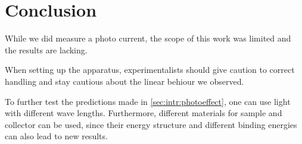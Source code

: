 \section{Conclusion}
\label{sec:conclusion}
While we did measure a photo current, the scope of this work was limited and the results are
lacking.

When setting up the apparatus, experimentalists should give caution to correct handling and stay
cautious about the linear behiour we observed. 

To further test the predictions made in \autoref{sec:intr:photoeffect}, one can use light with 
different wave lengths. Furthermore, different materials for sample and collector can be used, since
their energy structure and different binding energies can also lead to new results.

